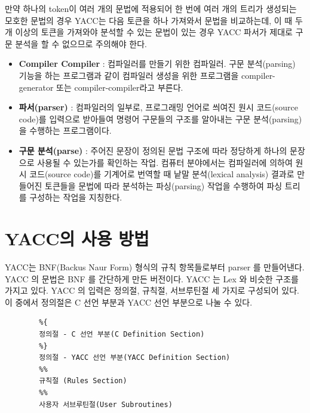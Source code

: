 \documentclass{article}
\begin{document}
\vspace{3mm}
\noindent
만약 하나의 token이 여러 개의 문법에 적용되어 한 번에 여러 개의 트리가 생성되는 모호한 문법의
경우 YACC는 다음 토큰을 하나 가져와서 문법을 비교하는데, 이 때 두 개 이상의 토큰을 가져와야
분석할 수 있는 문법이 있는 경우 YACC 파서가 제대로 구문 분석을 할 수 없으므로 주의해야 한다.

\begin{itemize}
	\item {\bf Compiler Compiler} : 컴파일러를 만들기 위한 컴파일러.
	구문 분석(parsing) 기능을 하는 프로그램과 같이 컴파일러 생성을 위한 프로그램을
	compiler-generator 또는 compiler-compiler라고 부른다.
	\item {\bf 파서(parser)} : 컴파일러의 일부로, 프로그래밍 언어로 씌여진 원시 코드(source code)를
	입력으로 받아들여 명령어 구문들의 구조를 알아내는 구문 분석(parsing)을 수행하는 프로그램이다.
	\item {\bf 구문 분석(parse)} : 주어진 문장이 정의된 문법 구조에 따라 정당하게 하나의 문장으로 사용될
	수 있는가를 확인하는 작업. 컴퓨터 분야에서는 컴파일러에 의하여 원시 코드(source code)를 기계어로 번역할
	때 낱말 분석(lexical analysis) 결과로 만들어진 토큰들을 문법에 따라 분석하는 파싱(parsing) 작업을
	수행하여 파싱 트리를 구성하는 작업을 지칭한다.
\end{itemize}

\section{YACC의 사용 방법}
YACC는 BNF(Backus Naur Form) 형식의 규칙 항목들로부터 parser 를 만들어낸다.
YACC 의 문법은 BNF 를 간단하게 만든 버전이다. YACC 는 Lex 와 비슷한 구조를 가지고 있다.
YACC 의 입력은 정의절, 규칙절, 서브루틴절 세 가지로 구성되어 있다. 이 중에서 정의절은
C 선언 부분과 YACC 선언 부분으로 나눌 수 있다.

\begin{lstlisting}
		%{
		정의절 - C 선언 부분(C Definition Section)
		%}
		정의절 - YACC 선언 부분(YACC Definition Section)
		%%
		규칙절 (Rules Section)
		%%
		사용자 서브루틴절(User Subroutines)
\end{lstlisting}
\end{document}
